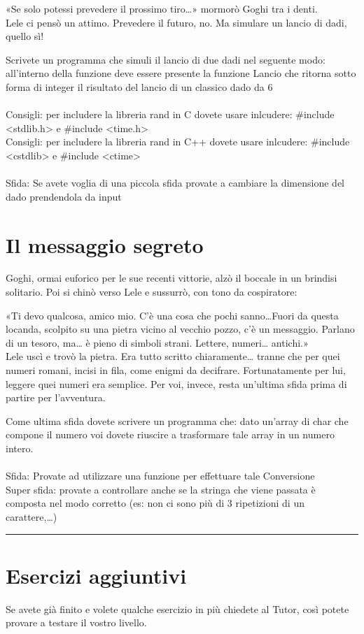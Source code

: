 \documentclass[a4paper]{article}
\begin{document}
«Se solo potessi prevedere il prossimo tiro…» mormorò Goghi tra i denti.\\
Lele ci pensò un attimo. Prevedere il futuro, no. Ma simulare un lancio di dadi, quello sì!

Scrivete un programma che simuli il lancio di due dadi nel seguente modo: all'interno della funzione deve essere presente la funzione Lancio che ritorna sotto forma di integer il risultato del lancio di un classico dado da 6\\
\\
Consigli: per includere la libreria rand in C dovete usare inlcudere: \#include <stdlib.h> e \#include <time.h>\\
Consigli: per includere la libreria rand in C++ dovete usare inlcudere: \#include <cstdlib> e \#include <ctime>\\
\\
Sfida: Se avete voglia di una piccola sfida provate a cambiare la dimensione del dado prendendola da input

\section*{Il messaggio segreto}
Goghi, ormai euforico per le sue recenti vittorie, alzò il boccale in un brindisi solitario. Poi si chinò verso Lele e sussurrò, con tono da cospiratore:

«Ti devo qualcosa, amico mio. C'è una cosa che pochi sanno\dots Fuori da questa locanda, scolpito su una pietra vicino al vecchio pozzo, c'è un messaggio. Parlano di un tesoro, ma… è pieno di simboli strani. Lettere, numeri… antichi.»\\
Lele uscì e trovò la pietra. Era tutto scritto chiaramente… tranne che per quei numeri romani, incisi in fila, come enigmi da decifrare.
Fortunatamente per lui, leggere quei numeri era semplice. Per voi, invece, resta un'ultima sfida prima di partire per l'avventura.

Come ultima sfida dovete scrivere un programma che: dato un'array di char che compone il numero voi dovete riuscire a trasformare tale array in un numero intero.\\
\\
Sfida: Provate ad utilizzare una funzione per effettuare tale Conversione\\
Super sfida: provate a controllare anche se la stringa che viene passata è composta nel modo corretto (es: non ci sono più di 3 ripetizioni di un carattere,\dots)

\noindent\rule{\linewidth}{0.4pt}
\section*{Esercizi aggiuntivi}
Se avete già finito e volete qualche esercizio in più chiedete al Tutor, così potete provare a testare il vostro livello.
\end{document}
